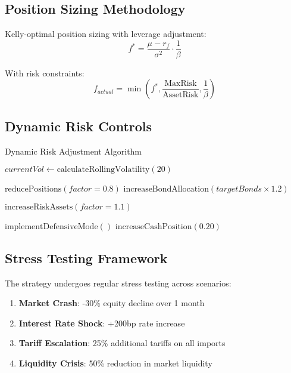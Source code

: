 \documentclass[onecolumn,ieee]{arithmaxresearch}
\begin{document}
\subsection{Position Sizing Methodology}

Kelly-optimal position sizing with leverage adjustment:
\begin{equation}
f^* = \frac{\mu - r_f}{\sigma^2} \cdot \frac{1}{\beta}
\end{equation}

With risk constraints:
\begin{equation}
f_{actual} = \min\left(f^*, \frac{\text{MaxRisk}}{\text{AssetRisk}}, \frac{1}{\beta}\right)
\end{equation}

\subsection{Dynamic Risk Controls}

\begin{algorithm}[h]
\caption{Dynamic Risk Adjustment Algorithm}
\label{alg:risk_adjustment}
\begin{algorithmic}[1]
    \State $currentVol \gets \text{calculateRollingVolatility}(20)$ 
    
        \State $\text{reducePositions}(factor = 0.8)$ 
        \State $\text{increaseBondAllocation}(targetBonds \times 1.2)$
    \EndIf
    
        \State $\text{increaseRiskAssets}(factor = 1.1)$ 
    \EndIf
    
     
        \State $\text{implementDefensiveMode}()$
        \State $\text{increaseCashPosition}(0.20)$
    \EndIf
\EndFunction
\end{algorithmic}
\end{algorithm}

\subsection{Stress Testing Framework}

The strategy undergoes regular stress testing across scenarios:

\begin{enumerate}
    \item \textbf{Market Crash}: -30\% equity decline over 1 month
    \item \textbf{Interest Rate Shock}: +200bp rate increase
    \item \textbf{Tariff Escalation}: 25\% additional tariffs on all imports
    \item \textbf{Liquidity Crisis}: 50\% reduction in market liquidity
\end{enumerate}
\end{document}
